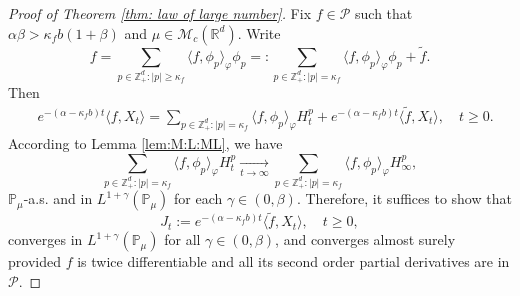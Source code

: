 \documentclass[12pt,a4paper]{amsart}
\theoremstyle{plain}
\theoremstyle{definition}
\numberwithin{equation}{section}
\begin{document}
\begin{proof}[Proof of Theorem \ref{thm: law of large number}]
	Fix $f \in \mathcal P$ such that $\alpha \beta > \kappa_f b (1+\beta)$ and $\mu \in \mathcal M_c(\mathbb R^d)$.
	Write
  \begin{equation}
    f
    = \sum_{p\in \mathbb Z_+^d:|p|\geq \kappa_f}\langle f,\phi_p\rangle_\varphi \phi_p
    =: \sum_{p\in \mathbb Z_+^d:|p|= \kappa_f}\langle f,\phi_p\rangle_\varphi \phi_p+\widetilde{f}.
  \end{equation}
	Then
  \begin{align}
    & e^{-(\alpha-\kappa_fb)t}\langle f,X_t\rangle=
      \sum_{p\in \mathbb Z_+^d:|p|= \kappa_f}\langle f,\phi_p\rangle_\varphi H_t^p+e^{-(\alpha-\kappa_fb)t} \langle \widetilde{f},X_t\rangle,
      \quad t\geq 0.
  \end{align}
	According to Lemma \ref{lem:M:L:ML}, we have
\begin{equation}
  \label{as convergence}
  \sum_{p\in \mathbb{Z}_+^d:|p|= \kappa_f}\langle f,\phi_p\rangle_\varphi H_t^p
  \xrightarrow[t\to \infty]{} \sum_{p\in \mathbb{Z}_+^d:|p|=\kappa_f}\langle f, \phi_p\rangle_{\varphi} H_{\infty}^p,
\end{equation}
$\mathbb{P}_{\mu}$-a.s. and in $L^{1+\gamma}(\mathbb{P}_{\mu})$ for each $\gamma\in(0,\beta)$.
Therefore, it suffices to show that
\begin{equation}
  J_t
  :=e^{-(\alpha-\kappa_fb)t}\langle \widetilde{f},X_t\rangle,
  \quad t\geq 0,
\end{equation}
converges in $L^{1+\gamma}(\mathbb{P}_{\mu})$ for all $\gamma\in(0,\beta)$, and converges almost surely provided $f$ is twice differentiable and all its second order partial derivatives are in $\mathcal{P}$.


\end{proof}
\end{document}

